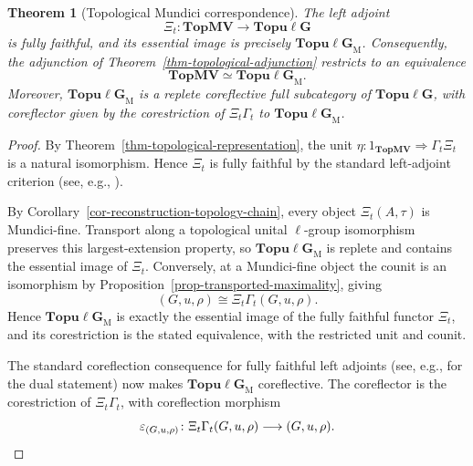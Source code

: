 \documentclass[preprint,3p]{elsarticle}
\theoremstyle{plain}
\newtheorem{thm}{Theorem}[section]
\theoremstyle{definition}
\newcommand{\TopMV}{\mathbf{TopMV}}
\newcommand{\Topulg}{\mathbf{Topu\ell G}}
\newcommand{\TopulgM}{\mathbf{Topu\ell G}_{\mathrm{M}}}
\numberwithin{equation}{section}
\begin{document}
\begin{thm}[Topological Mundici correspondence]
\label{thm-topological-correspondence}
\label{thm-intro-correspondence}
The left adjoint
\[
 \Xi_t\colon\TopMV\longrightarrow\Topulg
\]
is fully faithful, and its essential image is precisely
$\TopulgM$.  Consequently, the adjunction of
Theorem~\ref{thm-topological-adjunction} restricts to an equivalence
\[
 \TopMV\simeq\TopulgM.
\]
Moreover, $\TopulgM$ is a replete coreflective full subcategory of
$\Topulg$, with coreflector given by the corestriction of
$\Xi_t\Gamma_t$ to $\TopulgM$.
\end{thm}

\begin{proof}
By Theorem~\ref{thm-topological-representation}, the unit
$\eta\colon1_{\TopMV}\Longrightarrow\Gamma_t\Xi_t$ is a natural
isomorphism.  Hence $\Xi_t$ is fully faithful by the standard
left-adjoint criterion
(see, e.g., \cite[Proposition~II.2.6.1]{Hofmann2014}).

By Corollary~\ref{cor-reconstruction-topology-chain}, every object
$\Xi_t(A,\tau)$ is Mundici-fine.
Transport along a topological unital $\ell$-group isomorphism
preserves this largest-extension property, so $\TopulgM$ is replete
and contains the essential image of $\Xi_t$.
Conversely, at a Mundici-fine object the counit is an isomorphism by
Proposition~\ref{prop-transported-maximality}, giving
\[
 (G,u,\rho)\cong\Xi_t\Gamma_t(G,u,\rho).
\]
Hence $\TopulgM$ is exactly the essential image of the fully
faithful functor $\Xi_t$, and its corestriction is the stated
equivalence, with the restricted unit and counit.

The standard coreflection consequence for fully faithful left
adjoints (see, e.g., \cite[Corollary~II.2.6.3]{Hofmann2014} for the
dual statement) now makes $\TopulgM$ coreflective.
The coreflector is the corestriction of $\Xi_t\Gamma_t$, with
coreflection morphism
\[
 \varepsilon_{(G,u,\rho)}\colon
 \Xi_t\Gamma_t(G,u,\rho)\longrightarrow(G,u,\rho).
 \qedhere
\]
\end{proof}
\end{document}
